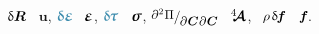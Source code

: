 \vspace{-0.1em} \noindent
{}
${\updelta\hspace{-0.1ex}\bm{R}}$ ~$\bm{u}$,
$\varbivalent{\mathboldepsilon\hspace{-0.16ex}}$ ~$\mathboldepsilon$,
$\varbivalent{\hspace{-0.16ex}\cauchystress}$ ~$\linearstress$,
${\scalebox{0.95}[0.95]{$ \raisemath{.16em}{\scalebox{0.92}[0.92]{$\partial^2 \hspace{.1ex} \Pi$}} / \hspace{-0.1ex} \raisemath{-0.32em}{\scalebox{0.92}[0.92]{$\partial \hspace{.1ex} \bm{C} \hspace{.1ex} \partial \hspace{.1ex} \bm{C}$}} $}}$ ~$\hspace{.08ex}{^4\hspace{-0.72ex}\bm{\mathcal{A}}}\hspace{.08ex}$,
~${\hspace{-0.1ex} \rho \hspace{.25ex} \variation{\hspace{-0.2ex}\bm{f}}}$ ~${\hspace{-0.1ex} \bm{f}\hspace{-0.2ex}}$.

